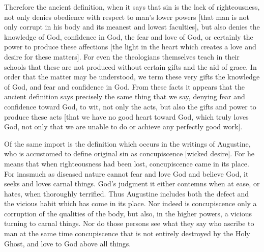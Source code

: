 Therefore the ancient definition, when it says that sin is the lack
of righteousness, not only denies obedience with respect to man's
lower powers [that man is not only corrupt in his body and its
meanest and lowest faculties], but also denies the knowledge of God,
confidence in God, the fear and love of God, or certainly the power
to produce these affections [the light in the heart which creates a
love and desire for these matters].  For even the theologians
themselves teach in their schools that these are not produced without
certain gifts and the aid of grace.  In order that the matter may be
understood, we term these very gifts the knowledge of God, and fear
and confidence in God.  From these facts it appears that the ancient
definition says precisely the same thing that we say, denying fear
and confidence toward God, to wit, not only the acts, but also the
gifts and power to produce these acts [that we have no good heart
toward God, which truly loves God, not only that we are unable to do
or achieve any perfectly good work].

Of the same import is the definition which occurs in the writings of
Augustine, who is accustomed to define original sin as concupiscence
[wicked desire].  For he means that when righteousness had been lost,
concupiscence came in its place.  For inasmuch as diseased nature
cannot fear and love God and believe God, it seeks and loves carnal
things.  God's judgment it either contemns when at ease, or hates,
when thoroughly terrified.  Thus Augustine includes both the defect
and the vicious habit which has come in its place.  Nor indeed is
concupiscence only a corruption of the qualities of the body, but
also, in the higher powers, a vicious turning to carnal things.  Nor
do those persons see what they say who ascribe to man at the same
time concupiscence that is not entirely destroyed by the Holy Ghost,
and love to God above all things.

